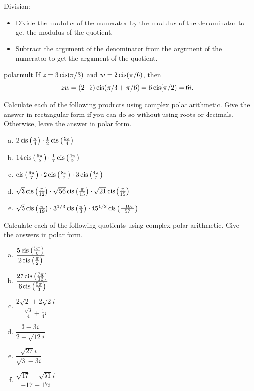 {\medskip{}
\noindent
Division:
\begin{itemize}
\item
Divide the modulus of the numerator by the modulus of the denominator to get the modulus of the quotient.
\item
Subtract the argument of the denominator from the argument of the numerator to get the argument of the quotient.
\end{itemize}

\begin{example}{polarmult} If $z=3\operatorname{cis}(\pi/3)$ and $w=2\operatorname{cis}(\pi/6)$,
then $$zw=(2\cdot3)\operatorname{cis}(\pi/3 + \pi/6)= 6 \operatorname{cis}(\pi/2)=6i.$$ \end{example}

\begin{exercise}{25}
Calculate each of the following products using complex polar arithmetic. Give the answer in rectangular form if you can do so without using roots or decimals. Otherwise, leave the answer in polar form.
\begin{enumerate}[(a)]
 
 \item
$2\operatorname{cis}\left(\frac{\pi}{4}\right) \cdot \frac{1}{2} \operatorname{cis}\left( \frac{3\pi}{4}\right)$
 \item
$14\operatorname{cis}\left( \frac{6\pi}{5}\right) \cdot \frac{1}{7} \operatorname{cis}\left( \frac{4\pi}{5} \right) $
\item
$\operatorname{cis}\left(\frac{9\pi}{7}\right) \cdot 2 \operatorname{cis}\left( \frac{8\pi}{7}\right) \cdot 3 \operatorname{cis}\left( \frac{4\pi}{7}\right)$
\item
$\sqrt{3}\operatorname{cis}\left(\frac{\pi}{12}\right)\cdot \sqrt{56}\operatorname{cis}\left(\frac{\pi}{15}\right)\cdot \sqrt{21}\operatorname{cis}\left(\frac{\pi}{15}\right)$
\item
$\sqrt{5}\operatorname{cis}\left(\frac{\pi}{19}\right)\cdot 3^{1/3} \operatorname{cis}\left(\frac{\pi}{3}\right)\cdot 45^{1/3}\operatorname{cis}\left(\frac{-10\pi}{57}\right)$
\end{enumerate}
\end{exercise}

\begin{exercise}{26}
Calculate each of the following quotients using complex polar arithmetic. Give the answers in polar form.
\begin{multicols}{2}
\begin{enumerate}[(a)]
\item
$\dfrac{5\operatorname{cis}\left( \frac{5\pi}{6}\right)}{2\operatorname{cis} \left( \frac{\pi}{2}\right)}$
\item
$\dfrac{27\operatorname{cis}\left(\frac{7\pi}{12}\right)}{6\operatorname{cis}\left(\frac{5\pi}{3}\right)}$
\item
$\dfrac{2\sqrt{2} + 2\sqrt{2}i}{\frac{\sqrt{3}}{4} + \frac{1}{4}i}$
\item
$\dfrac{3 - 3i}{2 - \sqrt{12}i}$
\item
$\dfrac{\sqrt{27} i}{\sqrt{3} - 3i}$
\item
$\dfrac{\sqrt{17} - \sqrt{51} i}{-17 - 17i}$
 

\end{enumerate}
\end{multicols}
\end{exercise}}
